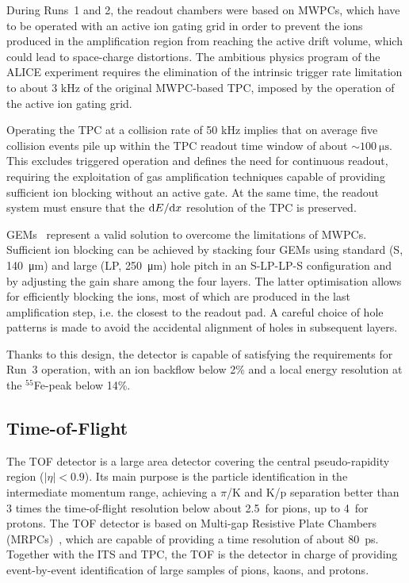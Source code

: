 During Runs~1 and 2, the readout chambers were based on MWPCs, which have to be operated with an active ion gating grid in order to prevent the ions produced in the amplification region from reaching the active drift volume, which could lead to space-charge distortions. The ambitious physics program of the ALICE experiment requires the elimination of the intrinsic trigger rate limitation to about 3 kHz of the original MWPC-based TPC, imposed by the operation of the active ion gating grid.

Operating the TPC at a collision rate of 50 kHz implies that on average five collision events pile up within the TPC readout time window of about $\sim\SI{100}{\micro\second}$. This excludes triggered operation and defines the need for continuous readout, requiring the exploitation of gas amplification techniques capable of providing sufficient ion blocking without an active gate. At the same time, the readout system must ensure that the $\mathrm{d} E/\mathrm{d} x$ resolution of the TPC is preserved.

GEMs~\cite{Sauli:1997qp} represent a valid solution to overcome the limitations of MWPCs. Sufficient ion blocking can be achieved by stacking four GEMs using standard (S, \SI{140}{\micro\meter}) and large (LP, \SI{250}{\micro\meter}) hole pitch in an S-LP-LP-S configuration and by adjusting the gain share among the four layers. The latter optimisation allows for efficiently blocking the ions, most of which are produced in the last amplification step, i.e. the closest to the readout pad. A careful choice of hole patterns is made to avoid the accidental alignment of holes in subsequent layers. 

Thanks to this design, the detector is capable of satisfying the requirements for Run~3 operation, with an ion backflow below 2\% and a local energy resolution at the $^{55}$Fe-peak below 14\%.

\subsection{Time-of-Flight}
The TOF detector is a large area detector covering the central pseudo-rapidity region ($\lvert\eta\rvert < 0.9$). Its main purpose is the particle identification in the intermediate momentum range, achieving a $\pi$/K and K/p separation better than 3 times the time-of-flight resolution below about 2.5~\gevc for pions, up to 4~\gevc for protons. The TOF detector is based on Multi-gap Resistive Plate Chambers (MRPCs)~\cite{Wang:2020iwn}, which are capable of providing a time resolution of about 80~ps. Together with the ITS and TPC, the TOF is the detector in charge of providing event-by-event identification of large samples of pions, kaons, and protons.

